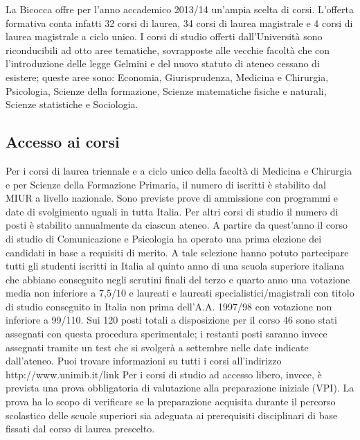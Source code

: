 La Bicocca offre per l'anno accademico 2013/14 un'ampia scelta di corsi. L'offerta formativa conta infatti 32 corsi di laurea, 34 corsi di laurea magistrale e 4 corsi di laurea magistrale a ciclo unico. I corsi di studio offerti dall'Università sono riconducibili ad otto aree tematiche, sovrapposte alle vecchie facoltà che  con l'introduzione delle legge Gelmini e del nuovo statuto di ateneo cessano di esistere; queste aree sono: Economia, Giurisprudenza, Medicina e Chirurgia, Psicologia, Scienze della formazione, Scienze matematiche fisiche e naturali, Scienze statistiche e Sociologia. 

\subsection{Accesso ai corsi}
Per i corsi di laurea triennale e a ciclo unico della facoltà di Medicina e Chirurgia e per Scienze della Formazione Primaria, il numero di iscritti è stabilito dal MIUR a livello nazionale. Sono previste prove di ammissione con programmi e date di svolgimento uguali in tutta Italia. Per altri corsi di studio il numero di posti è stabilito annualmente da ciascun ateneo. A partire da quest'anno il corso di studio di Comunicazione e Psicologia ha operato una prima elezione dei candidati in base a requisiti di merito. A tale selezione hanno potuto partecipare tutti gli studenti iscritti in Italia al quinto anno di una scuola superiore italiana che abbiano conseguito negli scrutini finali del terzo e quarto anno una votazione media non inferiore a 7,5/10 e laureati e laureati specialistici/magistrali con titolo di studio conseguito in Italia non prima dell'A.A. 1997/98 con votazione non inferiore a 99/110. Sui 120 posti totali a disposizione per il corso 46 sono stati assegnati con questa procedura sperimentale; i restanti posti saranno invece assegnati tramite un test che si svolgerà a settembre nelle date indicate dall'ateneo.
Puoi trovare informazioni su tutti i corsi all'indirizzo http://www.unimib.it/link
Per i corsi di studio ad accesso libero, invece, è prevista una prova obbligatoria di valutazione alla preparazione iniziale (VPI). La prova ha lo scopo di verificare se la preparazione acquisita durante il percorso scolastico delle scuole superiori sia adeguata ai prerequisiti disciplinari di base fissati dal corso di laurea prescelto. 

